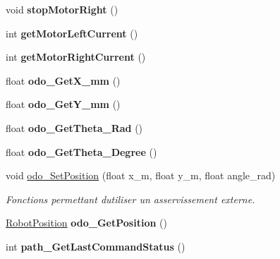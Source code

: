 \begin{DoxyCompactItemize}
\mbox{\label{classAsservDriver_ab24bc1636143db604ecbad3b18a17c8c}} 
void {\bfseries stop\+Motor\+Right} ()
\item 
\mbox{\label{classAsservDriver_ab93d873dc060cff42befa9e50a4a0b32}} 
int {\bfseries get\+Motor\+Left\+Current} ()
\item 
\mbox{\label{classAsservDriver_ace1b02fcab067c77ee71a134614ace50}} 
int {\bfseries get\+Motor\+Right\+Current} ()
\item 
\mbox{\label{classAsservDriver_a36553ad50ed9ef85fead94ac46077f65}} 
float {\bfseries odo\+\_\+\+Get\+X\+\_\+mm} ()
\item 
\mbox{\label{classAsservDriver_a69f277c28bf7b0f5642c446a2b8813b1}} 
float {\bfseries odo\+\_\+\+Get\+Y\+\_\+mm} ()
\item 
\mbox{\label{classAsservDriver_a2924f7f5b0cb429113655788437bffa7}} 
float {\bfseries odo\+\_\+\+Get\+Theta\+\_\+\+Rad} ()
\item 
\mbox{\label{classAsservDriver_af764eb227ab106c4dde5c4642cf42e6e}} 
float {\bfseries odo\+\_\+\+Get\+Theta\+\_\+\+Degree} ()
\item 
\mbox{\label{classAsservDriver_a036a5d7db2270ee5d388f0b6feaa253b}} 
void \hyperlink{classAsservDriver_a036a5d7db2270ee5d388f0b6feaa253b}{odo\+\_\+\+Set\+Position} (float x\+\_\+m, float y\+\_\+m, float angle\+\_\+rad)
\begin{DoxyCompactList}\small\item\em Fonctions permettant d\textquotesingle{}utiliser un asservissement externe. \end{DoxyCompactList}\item 
\mbox{\label{classAsservDriver_a0a62fbec28bfc5510eb75b6ad434baed}} 
\hyperlink{structRobotPosition}{Robot\+Position} {\bfseries odo\+\_\+\+Get\+Position} ()
\item 
\mbox{\label{classAsservDriver_ac4b8627777e76c145265a8e988852484}} 
int {\bfseries path\+\_\+\+Get\+Last\+Command\+Status} ()

\end{DoxyCompactItemize}
